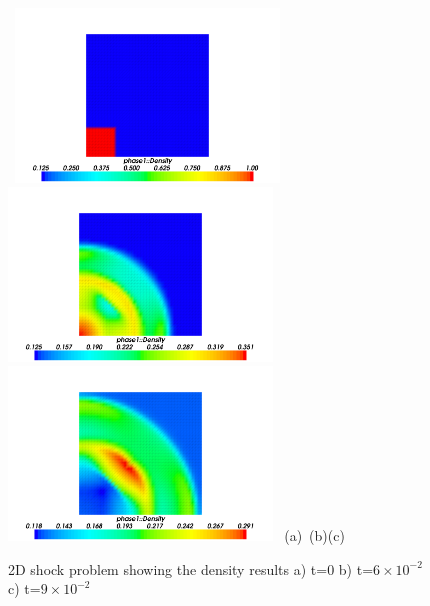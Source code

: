 \begin{figure}[H]
\vbox{
\hbox{
\hspace{-1.cm}
\includegraphics[width=7.0cm]{./doc_figures/shock/2d-shock-d0}
\hspace{-1.cm}
\includegraphics[width=7.0cm]{./doc_figures/shock/2d-shock-d60}
\hspace{-1.cm}
\includegraphics[width=7.0cm]{./doc_figures/shock/2d-shock-d90}
}
\vspace{-0.cm}
\hbox{\hspace{4.cm}(a) \hspace{4.5cm}(b)\hspace{4.5cm}(c)}
\vspace{-0.cm}}
\label{2d-density-mesh}
\caption{ 2D shock problem showing the density results a) 
t=0 b) t=$6\times 10^{-2}$ c) t=$9\times 10^{-2}$ }
\end{figure}


